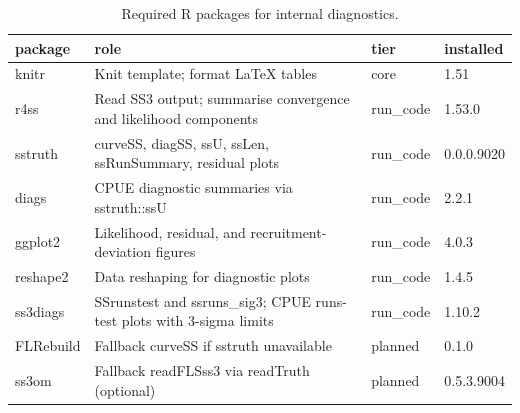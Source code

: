 \begin{table}

\caption{\label{tab:internal-libraries}Required R packages for internal diagnostics.}
\centering
\begin{tabular}[t]{llll}
\toprule
package & role & tier & installed\\
\midrule
knitr & Knit template; format LaTeX tables & core & 1.51\\
r4ss & Read SS3 output; summarise convergence and likelihood components & run\_code & 1.53.0\\
sstruth & curveSS, diagSS, ssU, ssLen, ssRunSummary, residual plots & run\_code & 0.0.0.9020\\
diags & CPUE diagnostic summaries via sstruth::ssU & run\_code & 2.2.1\\
ggplot2 & Likelihood, residual, and recruitment-deviation figures & run\_code & 4.0.3\\
\addlinespace
reshape2 & Data reshaping for diagnostic plots & run\_code & 1.4.5\\
ss3diags & SSrunstest and ssruns\_sig3; CPUE runs-test plots with 3-sigma limits & run\_code & 1.10.2\\
FLRebuild & Fallback curveSS if sstruth unavailable & planned & 0.1.0\\
ss3om & Fallback readFLSss3 via readTruth (optional) & planned & 0.5.3.9004\\
\bottomrule
\end{tabular}
\end{table}

